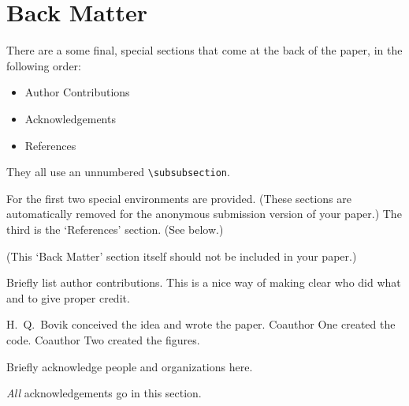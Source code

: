 \documentclass[accepted]{uai2021} %
\theoremstyle{definition}
\begin{document}
\section{Back Matter}
There are a some final, special sections that come at the back of the paper, in the following order:
\begin{itemize}
  \item Author Contributions
  \item Acknowledgements
  \item References
\end{itemize}
They all use an unnumbered \verb|\subsubsection|.

For the first two special environments are provided.
(These sections are automatically removed for the anonymous submission version of your paper.)
The third is the ‘References’ section.
(See below.)

(This ‘Back Matter’ section itself should not be included in your paper.)

\begin{contributions} %
    Briefly list author contributions.
    This is a nice way of making clear who did what and to give proper credit.

    H.~Q.~Bovik conceived the idea and wrote the paper.
    Coauthor One created the code.
    Coauthor Two created the figures.
\end{contributions}

\begin{acknowledgements} %
    Briefly acknowledge people and organizations here.

    \emph{All} acknowledgements go in this section.
\end{acknowledgements}
\fi
\end{document}
